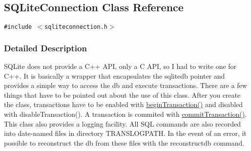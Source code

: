 \hypertarget{classSQLiteConnection}{
\subsection{SQLite\-Connection Class Reference}
\label{classSQLiteConnection}
}
{\tt \#include $<$sqliteconnection.h$>$}



\subsubsection{Detailed Description}
SQLite does not provide a C++ API, only a C API, so I had to write one for C++. It is basically a wrapper that encapsulates the sqlitedb pointer and provides a simple way to access the db and execute transactions. There are a few things that have to be pointed out about the use of this class. After you create the class, transactions have to be enabled with \hyperlink{classSQLiteConnection_SQLiteConnectiona6}{begin\-Transaction()} and disabled with disable\-Transaction(). A transaction is commited with \hyperlink{classSQLiteConnection_SQLiteConnectiona7}{commit\-Transaction()}. This class also provides a logging facility. All SQL commands are also recorded into date-named files in directory TRANSLOGPATH. In the event of an error, it possible to reconstruct the db from these files with the reconstructdb command. 



